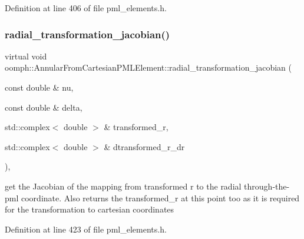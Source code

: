 Definition at line 406 of file pml\+\_\+elements.\+h.

\mbox{\label{classoomph_1_1AnnularFromCartesianPMLElement_a4095e343d2a36dac4e1d5f69402a4ff3}} 
\subsubsection{\texorpdfstring{radial\+\_\+transformation\+\_\+jacobian()}{radial\_transformation\_jacobian()}}
{\footnotesize\ttfamily virtual void oomph\+::\+Annular\+From\+Cartesian\+P\+M\+L\+Element\+::radial\+\_\+transformation\+\_\+jacobian (\begin{DoxyParamCaption}\item[{const double \&}]{nu,  }\item[{const double \&}]{delta,  }\item[{std\+::complex$<$ double $>$ \&}]{transformed\+\_\+r,  }\item[{std\+::complex$<$ double $>$ \&}]{dtransformed\+\_\+r\+\_\+dr }\end{DoxyParamCaption})\hspace{0.3cm}{\ttfamily [inline]}, {\ttfamily [virtual]}}



get the Jacobian of the mapping from transformed r to the radial through-\/the-\/pml coordinate. Also returns the transformed\+\_\+r at this point too as it is required for the transformation to cartesian coordinates 



Definition at line 423 of file pml\+\_\+elements.\+h.

\mbox{\label{classoomph_1_1AnnularFromCartesianPMLElement_acb66a5412d96aef573a498ffc8f7a72d}} 
